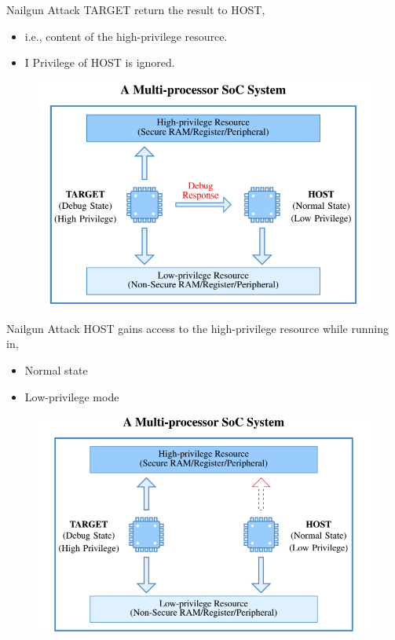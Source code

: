 \documentclass{beamer}
\begin{document}
\begin{frame}{Nailgun Attack}
TARGET return the result to HOST,
\begin{itemize}
    \item i.e., content of the high-privilege resource.
    \item I Privilege of HOST is ignored.
\end{itemize}
    \begin{figure}
        \centering
        \includegraphics[scale=.40]{SUSTech-Beamer-Theme/pic/Nailgun10.png}
        \label{fig:my_label}
    \end{figure}
\end{frame}

\begin{frame}{Nailgun Attack}
HOST gains access to the high-privilege resource while running in,
\begin{itemize}
    \item Normal state 
    \item Low-privilege mode
\end{itemize}
    \begin{figure}
        \centering
        \includegraphics[scale=.40]{SUSTech-Beamer-Theme/pic/Nailgun11.png}
        \label{fig:my_label}
    \end{figure}
\end{frame}
\end{document}
